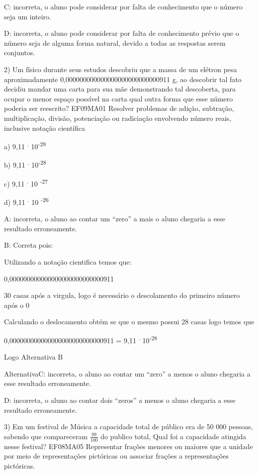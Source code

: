 C: incorreta, o aluno pode considerar por falta de conhecimento que o
número seja um inteiro.

D: incorreta, o aluno pode considerar por falta de conhecimento prévio
que o número seja de alguma forma natural, devido a todas as respostas
serem conjuntos.

2) Um físico durante seus estudos descobriu que a massa de um elétron
pesa aproximadamente 0,000000000000000000000000000911 g, ao descobrir
tal fato decidiu mandar uma carta para sua mãe demonstrando tal
descoberta, para ocupar o menor espaço possível na carta qual outra
forma que esse número poderia ser reescrito? EF09MA01 Resolver problemas
de adição, subtração, multiplicação, divisão, potenciação ou radiciação
envolvendo número reais, inclusive notação científica

a) 9,11 \textsuperscript{.} 10\textsuperscript{-29}

b) 9,11 \textsuperscript{.} 10\textsuperscript{-28}

c) 9,11 \textsuperscript{.} 10 \textsuperscript{-27}

d) 9,11 \textsuperscript{.} 10 \textsuperscript{-26}

A: incorreta, o aluno ao contar um ``zero'' a mais o aluno chegaria a
esse resultado erroneamente.

B: Correta pois:

Utilizando a notação cientifica temos que:

0,000000000000000000000000000911

30 casas após a virgula, logo é necessário o descolamento do primeiro
número após o 0

Calculando o deslocamento obtém se que o mesmo possui 28 casas logo
temos que

0,000000000000000000000000000911 = 9,11 \textsuperscript{.}
10\textsuperscript{-28}

Logo Alternativa B

AlternativaC: incorreta, o aluno ao contar um ``zero'' a menos o aluno
chegaria a esse resultado erroneamente.

D: incorreta, o aluno ao contar dois ``zeros'' a menos o aluno chegaria
a esse resultado erroneamente.

3) Em um festival de Música a capacidade total de público era de 50 000
pessoas, sabendo que compareceram \(\frac{99}{100}\) do publico total,
Qual foi a capacidade atingida nesse festival? EF08MA05 Representar
frações menores ou maiores que a unidade por meio de representações
pictóricas ou associar frações a representações pictóricas.

